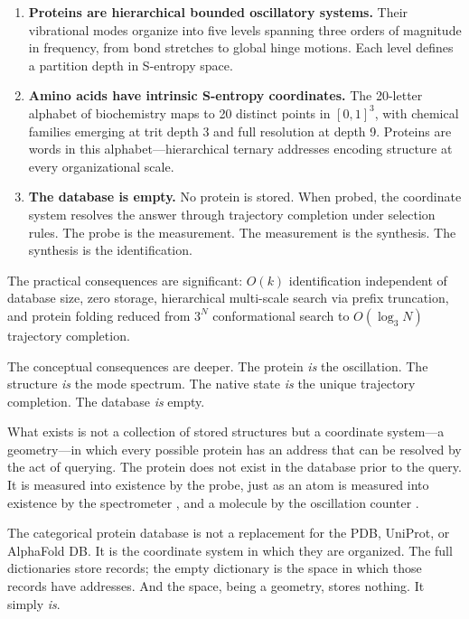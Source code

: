 \documentclass[11pt,twocolumn,a4paper]{article}
\theoremstyle{definition}
\theoremstyle{remark}
\begin{document}
\begin{enumerate}[nosep]
\item \textbf{Proteins are hierarchical bounded oscillatory systems.} Their vibrational modes organize into five levels spanning three orders of magnitude in frequency, from bond stretches to global hinge motions. Each level defines a partition depth in S-entropy space.

\item \textbf{Amino acids have intrinsic S-entropy coordinates.} The 20-letter alphabet of biochemistry maps to 20 distinct points in $[0,1]^3$, with chemical families emerging at trit depth 3 and full resolution at depth 9. Proteins are words in this alphabet---hierarchical ternary addresses encoding structure at every organizational scale.

\item \textbf{The database is empty.} No protein is stored. When probed, the coordinate system resolves the answer through trajectory completion under selection rules. The probe is the measurement. The measurement is the synthesis. The synthesis is the identification.
\end{enumerate}

The practical consequences are significant: $O(k)$ identification independent of database size, zero storage, hierarchical multi-scale search via prefix truncation, and protein folding reduced from $3^N$ conformational search to $O(\log_3 N)$ trajectory completion.

The conceptual consequences are deeper. The protein \emph{is} the oscillation. The structure \emph{is} the mode spectrum. The native state \emph{is} the unique trajectory completion. The database \emph{is} empty.

What exists is not a collection of stored structures but a coordinate system---a geometry---in which every possible protein has an address that can be resolved by the act of querying. The protein does not exist in the database prior to the query. It is measured into existence by the probe, just as an atom is measured into existence by the spectrometer \citep{sachikonye2025b}, and a molecule by the oscillation counter \citep{sachikonye2025a}.

The categorical protein database is not a replacement for the PDB, UniProt, or AlphaFold DB. It is the coordinate system in which they are organized. The full dictionaries store records; the empty dictionary is the space in which those records have addresses. And the space, being a geometry, stores nothing. It simply \emph{is}.
\end{document}
